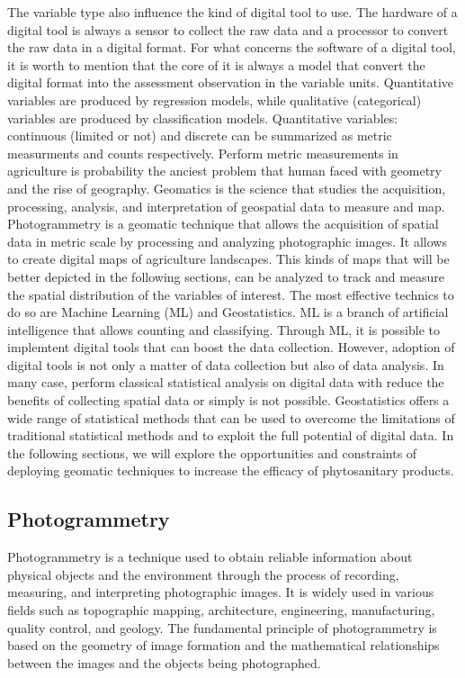 \documentclass[12pt,a4paper,oneside]{report}
\begin{document}
The variable type also influence the kind of digital tool to use.
The hardware of a digital tool is always a sensor to collect the raw data and a
processor to convert the raw data in a digital format.
For what concerns the software of a digital tool, it is worth to mention that
the core of it is always a model that convert the digital format into the assessment
observation in the variable units.
Quantitative variables are produced by regression models, while qualitative (categorical) 
variables are produced by classification models. 
Quantitative variables: continuous (limited or not) and discrete
can be summarized as metric measurments and counts respectively. 
Perform metric measurements in agriculture is probability the anciest
problem that human faced with geometry and the rise of geography. 
Geomatics is the science that
studies the acquisition, processing, analysis, and interpretation of
geospatial data to measure and map.
Photogrammetry is a geomatic technique that allows the acquisition of spatial
data in metric scale by processing and analyzing photographic images.
It allows to create digital maps of agriculture landscapes. This kinds of maps
that will be better depicted in the following sections, can be analyzed to
track and measure the spatial distribution of the variables of interest.
The most effective technics to do so are Machine Learning (ML) and Geostatistics.
ML is a branch of artificial intelligence
that allows counting and classifying.
Through ML, it is possible to implemtent 
digital tools that can boost the data collection.
However, adoption of digital tools is not only a matter of data collection but also of data
analysis. In many case, perform classical statistical analysis on digital data with 
reduce the benefits of collecting spatial data or simply is not possible. 
Geostatistics offers a wide range of statistical methods that can be used to
overcome the limitations of traditional statistical methods and to exploit the
full potential of digital data.
In the following sections, we will explore the opportunities and constraints of
deploying geomatic techniques to increase the efficacy of phytosanitary products.

\subsection{Photogrammetry}

Photogrammetry is a technique used to obtain reliable information about physical 
objects and the environment through the process of recording, measuring, and interpreting 
photographic images. It is widely used in various fields such as topographic mapping, 
architecture, engineering, manufacturing, quality control, and geology. The fundamental 
principle of photogrammetry is based on the geometry of image formation and the 
mathematical relationships between the images and the objects being photographed.
\end{document}

